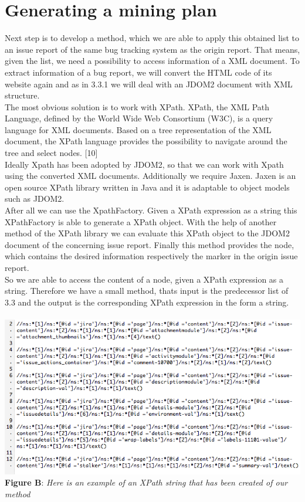 \section{Generating a mining plan}
\label{Generating a mining plan}
Next step is to develop a method, which we are able to apply this obtained list to an issue report of the same bug tracking system as the origin report. That means, given the list, we need a possibility to access information of a XML document. To extract information of a bug report, we will convert the HTML code of its website again and as in 3.3.1 we will deal with an JDOM2 document with XML structure. \\ The most obvious solution is to work with XPath. XPath, the XML Path Language, defined by the World Wide Web Consortium (W3C), is a query language for XML documents. Based on a tree representation of the XML document, the XPath language provides the possibility to navigate around the tree and select nodes. [10] \\
Ideally Xpath has been adopted by JDOM2, so that we can work with Xpath using the converted XML documents. Additionally we require Jaxen. Jaxen is an open source XPath library written in Java and it is adaptable to object models such as JDOM2. \\ After all we can use the XpathFactory. Given a XPath expression as a string this XPathFactory is able to generate a XPath object. With the help of another method of the XPath library we can evaluate this XPath object to the JDOM2 document of the concerning issue report. Finally this method provides the node, which contains the desired information respectively the marker in the origin issue report. \\ So we are able to access the content of a node, given a XPath expression as a string.
Therefore we have a small method, thats input is the predecessor list of 3.3 and the output is the corresponding XPath expression in the form a string.
\\ \\ \includegraphics[width=1.0\textwidth]{xpath-example.png}  \\\textbf{Figure B}: \textit{Here is an example of an XPath string that has been created of our method} \\ \\
